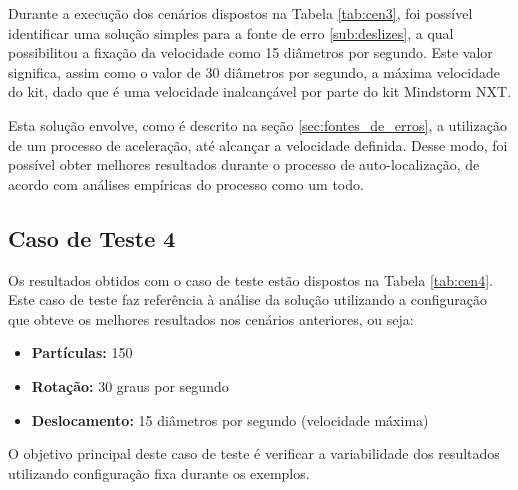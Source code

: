 Durante a execução dos cenários dispostos na Tabela \ref{tab:cen3}, foi possível identificar uma solução simples para a fonte de erro
\ref{sub:deslizes}, a qual possibilitou a fixação da velocidade como 15 diâmetros por segundo. Este valor significa, assim como o valor de 30 diâmetros por segundo, a máxima
velocidade do kit, dado que é uma velocidade inalcançável por parte do kit Mindstorm NXT.

Esta solução envolve, como é descrito na seção \ref{sec:fontes_de_erros}, a utilização de um processo de aceleração, até alcançar a velocidade
definida. Desse modo, foi possível obter melhores resultados durante o processo de auto-localização, de acordo com análises empíricas do
processo como um todo.

\subsection{Caso de Teste 4}
\label{sub:cen4}

Os resultados obtidos com o caso de teste estão dispostos na Tabela \ref{tab:cen4}. Este caso de teste faz referência à análise da solução
utilizando a configuração que obteve os melhores resultados nos cenários anteriores, ou seja:

\begin{itemize}
  \item \textbf{Partículas:} 150
  \item \textbf{Rotação:} 30 graus por segundo
  \item \textbf{Deslocamento:} 15 diâmetros por segundo (velocidade máxima)
\end{itemize}

O objetivo principal deste caso de teste é verificar a variabilidade dos resultados utilizando configuração fixa durante os exemplos.

